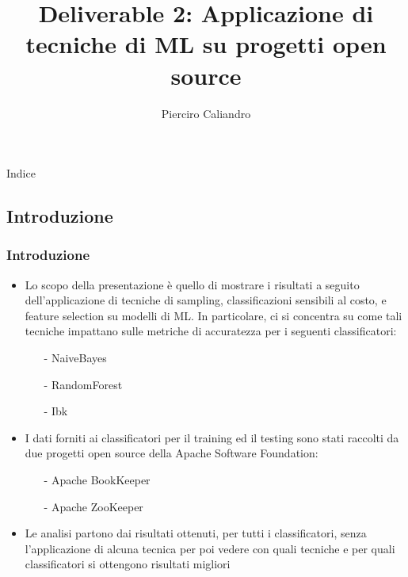 \documentclass[10pt]{beamer}
\title{Deliverable 2: Applicazione di tecniche di ML su progetti open source}
\author{Pierciro Caliandro}
\institute{Università degli studi di Roma Tor Vergata}
\begin{document}
\footnotesize
\begin{frame}
\titlepage
\end{frame}

\begin{frame}{Indice}
\tableofcontents
\end{frame}

\begin{frame}
\section{Introduzione}
\frametitle{Introduzione}
\begin{itemize}
\item Lo scopo della presentazione è quello di mostrare i risultati a seguito dell'applicazione di tecniche di sampling, classificazioni
sensibili al costo, e feature selection su modelli di ML. In particolare, ci si concentra su come tali tecniche impattano sulle metriche di accuratezza per i seguenti classificatori:
\begin{itemize}
\item[-] NaiveBayes
\item[-] RandomForest
\item[-] Ibk
\end{itemize}
\item I dati forniti ai classificatori per il training ed il testing sono stati raccolti da due progetti open source della Apache Software Foundation:
\begin{itemize}
\item[-] Apache BookKeeper
\item[-] Apache ZooKeeper
\end{itemize}
\item Le analisi partono dai risultati ottenuti, per tutti i classificatori, senza l'applicazione di alcuna tecnica per poi vedere con quali tecniche e per quali classificatori si ottengono risultati migliori
\end{itemize}
\end{frame}
\end{document}
